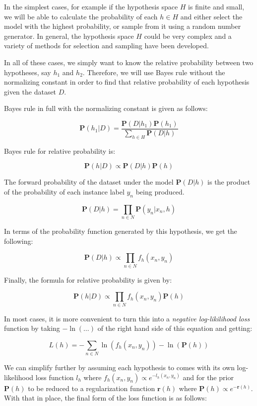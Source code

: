 \documentclass[twoside]{article}
\begin{document}
In the simplest cases, for example if the hypothesis space \(H\) is finite and small, we will be able to calculate the probability of each \(h \in H\) and either select the model with the highest probability, or sample from it using a random number generator. In general, the hypothesis space \(H\) could be very complex and a variety of methods for selection and sampling have been developed.

In all of these cases, we simply want to know the relative probability between two hypotheses, say \(h_1\) and \(h_2\). Therefore, we will use Bayes rule without the normalizing constant in order to find that relative probability of each hypothesis given the dataset \(D\).

Bayes rule in full with the normalizing constant is given as follows:

\[\mathbf{P}(h_1|D)=\frac{\mathbf{P}(D|h_1)\mathbf{P}(h_1)}{\sum_{h \in H}\mathbf{P}(D|h)}\]

Bayes rule for relative probability is:

\[\mathbf{P}(h|D)\propto\mathbf{P}(D|h)\mathbf{P}(h)\]

The forward probability of the dataset under the model \(\mathbf{P}(D|h)\) is the product of the probability of each instance label \(y_n\) being produced.

\[\mathbf{P}(D|h)=\prod_{n \in N} \mathbf{P}(y_n|x_n,h)\]

In terms of the probability function generated by this hypothesis, we get the following:

\[\mathbf{P}(D|h)\propto \prod_{n \in N} f_h(x_n,y_n)\]

Finally, the formula for relative probability is given by: 

\[\mathbf{P}(h|D)\propto\prod_{n \in N} f_h(x_n,y_n)\mathbf{P}(h)\]

In most cases, it is more convenient to turn this into a \textit{negative log-likilihood loss} function by taking \(-\ln(\ldots)\) of the right hand side of this equation and getting:

\[L(h)=-\sum_{n \in N} \ln(f_h(x_n,y_n))-\ln(\mathbf{P}(h))\]

We can simplify further by assuming each hypothesis to comes with its own log-likelihood loss function \(l_h\) where \(f_h(x_n,y_n)\propto e^{-l_h(x_n,y_n)}\) and for the prior \(\mathbf{P}(h)\) to be reduced to a regularization function \(\mathbf{r}(h)\) where \(\mathbf{P}(h)\propto e^{-\mathbf{r}(h)}\). With that in place, the final form of the loss function is as follows:
\end{document}
